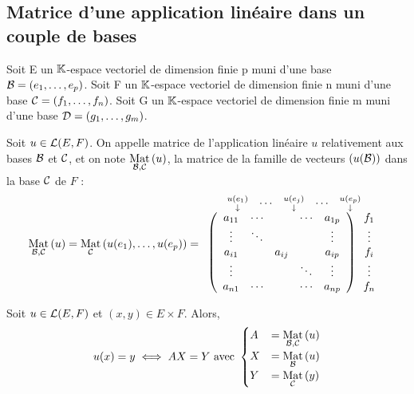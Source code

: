 \subsection{Matrice d’une application linéaire dans un couple de bases}
Soit E un \(\K\)-espace vectoriel de dimension finie p muni d’une base \(\cal{B} = (e_1, \dots , e_p)\).
Soit F un \(\K\)-espace vectoriel de dimension finie n muni d’une base \(\cal{C} = (f_1, \dots , f_n)\).
Soit G un \(\K\)-espace vectoriel de dimension finie m muni d’une base \(\cal{D} = (g_1, \dots , g_m)\).


\begin{defi}
    Soit \(u \in \cal{L}(E, F )\).
    On appelle matrice de l’application linéaire \(u\) relativement aux bases \(\cal{B}\) et \(\cal{C}\), et on note \(\Mat{\cal{B}, \cal{C}}{u}\), la matrice de la famille de vecteurs \((u(\cal{B}))\) dans la base \(\cal{C}\) de \(F\) :
    \[\Mat{\cal{B},\cal{C}}{u} = \Mat{\cal{C}}{u(e_1), \dots, u(e_p)}= \begin{array}{c}
  \begin{array}{cccccc}
     \substack{u(e_1) \\ \downarrow} 
     & \cdots 
     & \substack{u(e_j) \\ \downarrow} 
     & \cdots 
     & \substack{u(e_p) \\ \downarrow}
  \end{array} \\
  \left(
  \begin{array}{ccccc}
  a_{11} & \cdots &        & \cdots & a_{1p} \\
  \vdots & \ddots &        &        & \vdots \\
  a_{i1} &        & a_{ij} &        & a_{ip} \\
  \vdots &        &        & \ddots & \vdots \\
  a_{n1} & \cdots &        & \cdots & a_{np}
  \end{array}
  \right)
  \begin{array}{c}
  f_1 \\
  \vdots \\
  f_i \\
  \vdots \\
  f_n
  \end{array}
\end{array}
    \]

\end{defi}

\begin{defprop}
    Soit \(u \in \cal{L}(E, F )\) et \((x, y) \in E \times F\). Alors,
    \[u(x) = y \iff AX = Y \text{ avec } \begin{cases}
    A &= \Mat{\cal{B},\cal{C}}{u} \\
    X &= \Mat{\cal{B}}{u} \\
    Y &= \Mat{\cal{C}}{y} 
    \end{cases}
    \]
\end{defprop}

